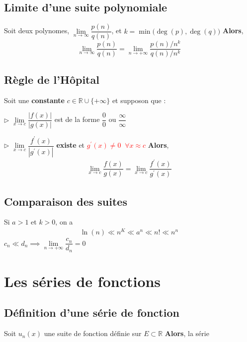 \documentclass{report}
\begin{document}
\begin{multicols*}{3}
    \section{Limite d'une suite polynomiale} 
        Soit deux polynomes,
        $\lim\limits_{n\to \infty } \dfrac{p(n)}{q(n)}$, 
        et 
        $k = \min\bigl(\deg(p), \deg(q)\bigr)$
        \textbf{Alors},   
        \[ \lim\limits_{n\to \infty } \dfrac{p(n)}{q(n)} =
        \lim\limits_{n\to+\infty}\dfrac{p(n)/{n^k}}{q(n)/n^{k}} \]



    \section{Règle de l'Hôpital}
        Soit une \textbf{constante} $c \in \mathbb{R} \cup \{+\infty\}$ et 
        supposon que : 

        \noindent 
        $\rhd $ $\lim\limits_{x\to c}\dfrac{|f(x)|}{|g(x)|}$ 
            est de la forme $\dfrac{0}{0}$ \; ou \; 
            $\dfrac{\infty }{\infty }$
        

        \noindent
        $\rhd$ $\lim\limits_{x\to c}\dfrac{f^{\prime}(x)}{|g^{\prime}(x)|}$
            \textbf{existe} et 
            \textcolor{red}{$g^{\prime}(x) \neq 0 \;\; \forall x \approx c$ }
        \textbf{Alors}, 
        \begin{align*}
            \boxed{ 
            \lim\limits_{x\to c}\dfrac{f(x)}{g(x)} = 
            \lim\limits_{x\to c}\dfrac{f^{\prime}(x)}{g^{\prime}(x)}
            }
        \end{align*}

                        

    \section{Comparaison des suites}
        Si $a > 1$ et $k > 0$, on a 
        \begin{align*}
            \ln(n) \ll n^K \ll a^n \ll n! \ll n^n
        \end{align*}
        $c_n \ll d_n \implies 
        \lim\limits_{n\to+\infty }\dfrac{c_n}{d_n} = 0$ 



    \chapter{Les séries de fonctions}

    \section{Définition d'une série de fonction}
        Soit $u_n(x)$ une suite de fonction définie sur $E \subset \mathbb{R}$ 
        \textbf{Alors}, la série  
    


\end{multicols*}
\end{document}

